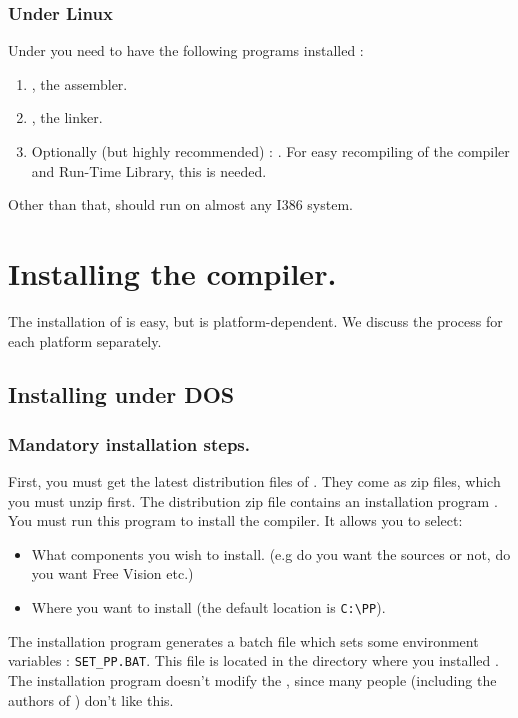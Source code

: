 \documentclass{report}
\begin{document}
\subsubsection{Under Linux}
Under \linux you need to have the following programs installed :
\begin{enumerate}
\item \gnu {}, the \gnu assembler.
\item \gnu {}, the \gnu linker.
\item Optionally (but highly recommended) : \gnu {}. For easy
recompiling of the compiler and Run-Time Library, this is needed.
\end{enumerate}
Other than that, \fpc should run on almost any I386 \linux system.

\section{Installing the compiler.}
The installation of \fpc is easy, but is platform-dependent.
We discuss the process for each platform separately.


%
%

\subsection{Installing under DOS}
\subsubsection{Mandatory installation steps.}
First, you must get the latest distribution files of \fpc. They come as zip
files, which you must unzip first. The distribution zip file contains an
installation program . You must run this program to install
the compiler. It allows you to select:
\begin{itemize}
\item What components you wish to install. (e.g do you want the sources or
not, do you want Free Vision etc.)
\item Where you want to install (the default location is \verb|C:\PP|).
\end{itemize}
The installation program generates a batch file which sets some environment
variables : \verb|SET_PP.BAT|. This file is located in the directory where
you installed \fpc. The installation program doesn't modify the 
, since many people (including the authors of \fpc) 
don't like this.
\end{document}
